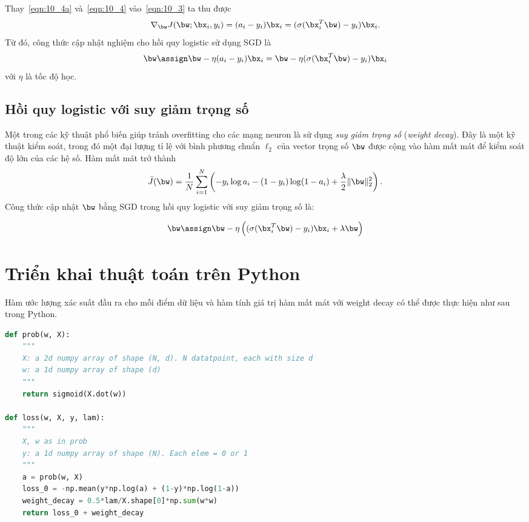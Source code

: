 Thay~\eqref{eqn:10_4a} và~\eqref{eqn:10_4} vào~\eqref{eqn:10_3} ta thu được
\begin{equation} 
\nabla_{\bw}J(\bw; \bx_i, y_i)
= (a_i - y_i)\bx_i = (\sigma(\bx_i^T\bw) - y_i)\bx_i. 
\end{equation} 
Từ đó, công thức cập nhật nghiệm cho hồi quy logistic sử dụng SGD là  
\begin{equation} 
\label{eqn:10_updatew}
\bw \assign \bw - \eta(a_i - y_i)\bx_i =\bw - \eta(\sigma(\bx_i^T\bw) - y_i)\bx_i 
\end{equation} 
với $\eta$ là tốc độ học. 

\subsection{Hồi quy logistic với suy giảm trọng số}
Một trong các kỹ thuật phổ biến giúp tránh overfitting cho các mạng neuron là sử
dụng \textit{suy giảm trọng số} (\textit{weight decay}). Đây là một kỹ thuật
kiểm soát, trong đó một đại lượng tỉ lệ với bình phương chuẩn $\ell_2$ của vector
trọng số $\bw$ được cộng vào hàm mất mát để kiểm soát độ lớn của các hệ số. Hàm
mất mát trở thành
\begin{equation}
    \bar{J}(\bw) = \frac{1}{N}\sum_{i=1}^N\left(-y_i \log a_i - (1-y_i) \log (1 - a_i) + \frac{\lambda}{2}\|\bw\|_2^2\right).
\end{equation}
Công thức cập nhật $\bw$ bằng SGD trong hồi quy logistic với suy giảm trọng số là:

\begin{equation}
\label{eqn:10_updatew_wdecay}
    \bw \assign \bw - \eta\left((\sigma(\bx_i^T\bw) - y_i)\bx_i + \lambda \bw\right)
\end{equation}

\section{Triển khai thuật toán trên Python}


Hàm ước lượng xác suất đầu ra cho mỗi điểm dữ liệu và hàm tính giá trị hàm mất mát với weight decay có thể được thực hiện như sau trong Python.
\begin{lstlisting}[language=Python]
def prob(w, X):
    """
    X: a 2d numpy array of shape (N, d). N datatpoint, each with size d
    w: a 1d numpy array of shape (d)
    """
    return sigmoid(X.dot(w))

def loss(w, X, y, lam):
    """
    X, w as in prob 
    y: a 1d numpy array of shape (N). Each elem = 0 or 1 
    """
    a = prob(w, X)
    loss_0 = -np.mean(y*np.log(a) + (1-y)*np.log(1-a))
    weight_decay = 0.5*lam/X.shape[0]*np.sum(w*w) 
    return loss_0 + weight_decay 
\end{lstlisting}

